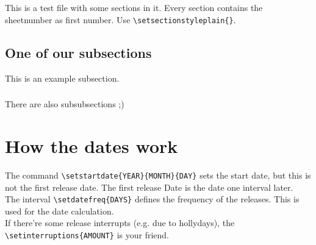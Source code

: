 \documentclass[a4paper]{article}
\begin{document}
	\maketitle
	\section{}
		This is a test file with some sections in it. Every section contains the sheetnumber as first number. Use \texttt{\textbackslash setsectionstyleplain\{\}}.
		\subsection{One of our subsections}
			This is an example subsection.
			\subsubsection{}
			There are also subsubsections ;)
	\section{How the dates work}
		The command \texttt{\textbackslash setstartdate\{YEAR\}\{MONTH\}\{DAY\}} sets the start date, but this is not the first release date. The first release Date is the date one interval later.\\
		The interval \texttt{\textbackslash setdatefreq\{DAYS\}} defines the frequency of the releases. This is used for the date calculation.\\
		If there're some release interrupts (e.g. due to hollydays), the \texttt{\textbackslash setinterruptions\{AMOUNT\}} is your friend.
\end{document}

